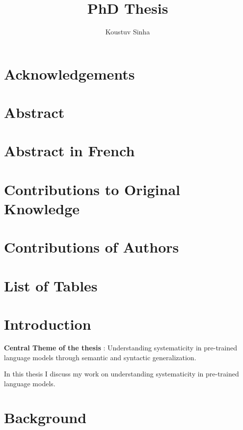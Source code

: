 \documentclass[letterpaper, 12pt]{report}
\author{Koustuv Sinha}
\date{}
\title{PhD Thesis}
\begin{document}
\maketitle
\raggedbottom
{}%
{}

\chapter*{Acknowledgements}
\label{sec:org111920c}
\chapter*{Abstract}
\label{sec:orgec62e8c}
\chapter*{Abstract in French}
\label{sec:org71795cd}
\chapter*{Contributions to Original Knowledge}
\label{sec:org3bc5b8a}
\chapter*{Contributions of Authors}
\label{sec:org2435b5a}
\listoffigures{}

\chapter*{List of Tables}
\label{sec:org85f7663}
\clearpage
\setcounter{tocdepth}{3}
\tableofcontents

\clearpage


\chapter{Introduction}
\label{sec:orgeb32902}

\textbf{\textbf{Central Theme of the thesis}} : Understanding systematicity in pre-trained language models through semantic and syntactic generalization.

In this thesis I discuss my work on understanding systematicity in pre-trained language models.

\clearpage

\chapter{Background}
\label{sec:orgaa03e11}
\end{document}
